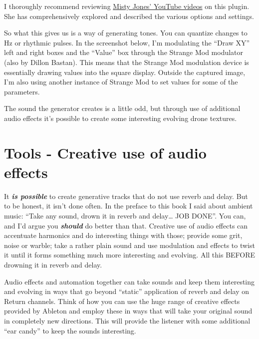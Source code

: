 \documentclass[
  12pt,
  letterpaper,
  oneside,
  open=any]{scrbook}
\makeatletter
\newcommand*\pandocbounded[1]{%
  \sbox\pandoc@box{#1}%
  \Gscale@div\@tempa{\textheight}{\dimexpr\ht\pandoc@box+\dp\pandoc@box\relax}%
  \Gscale@div\@tempb{\linewidth}{\wd\pandoc@box}%
  \ifdim\@tempb\p@<\@tempa\p@\let\@tempa\@tempb\fi%
  \ifdim\@tempa\p@<\p@\scalebox{\@tempa}{\usebox\pandoc@box}%
  \else\usebox{\pandoc@box}%
  \fi%
}
\makeatother
\begin{document}
I thoroughly recommend reviewing
\href{https://www.youtube.com/watch?v=dM2ksxavJzI}{Misty Jones' YouTube
videos} on this plugin. She has comprehensively explored and described
the various options and settings.

So what this gives us is a way of generating tones. You can quantize
changes to Hz or rhythmic pulses. In the screenshot below, I'm
modulating the ``Draw XY'' left and right boxes and the ``Value'' box
through the Strange Mod modulator (also by Dillon Bastan). This means
that the Strange Mod modulation device is essentially drawing values
into the square display. Outside the captured image, I'm also using
another instance of Strange Mod to set values for some of the
parameters.

The sound the generator creates is a little odd, but through use of
additional audio effects it's possible to create some interesting
evolving drone textures.

\pandocbounded{\texttt{[image: images/Cellular\_Degradation.png]}}


\chapter{Tools - Creative use of audio
effects}\label{015-Tools-Audio_Effects}

It \textbf{\emph{is possible}} to create generative tracks that do not
use reverb and delay. But to be honest, it isn't done often. In the
preface to this book I said about ambient music: ``Take any sound, drown
it in reverb and delay\ldots{} JOB DONE''. You can, and I'd argue you
\textbf{\emph{should}} do better than that. Creative use of audio
effects can accentuate harmonics and do interesting things with those;
provide some grit, noise or warble; take a rather plain sound and use
modulation and effects to twist it until it forms something much more
interesting and evolving. All this BEFORE drowning it in reverb and
delay.

\begin{tcolorbox}[enhanced jigsaw, toprule=.15mm, leftrule=.75mm, coltitle=black, bottomtitle=1mm, colbacktitle=quarto-callout-tip-color!10!white, bottomrule=.15mm, opacityback=0, colback=white, arc=.35mm, colframe=quarto-callout-tip-color-frame, opacitybacktitle=0.6, toptitle=1mm, titlerule=0mm, rightrule=.15mm, title=\textcolor{quarto-callout-tip-color}{\faLightbulb}\hspace{0.5em}{Key idea}, left=2mm, breakable]

Audio effects and automation together can take sounds and keep them
interesting and evolving in ways that go beyond ``static'' application
of reverb and delay on Return channels. Think of how you can use the
huge range of creative effects provided by Ableton and employ these in
ways that will take your original sound in completely new directions.
This will provide the listener with some additional ``ear candy'' to
keep the sounds interesting.

\end{tcolorbox}
\end{document}
